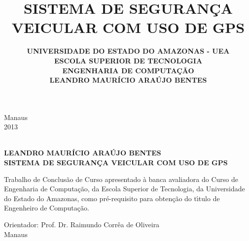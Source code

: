 \documentclass{dcctese}
\begin{document}


\thispagestyle{empty}



\title{ \textbf{SISTEMA DE SEGURAN\c{C}A VEICULAR COM USO DE GPS}}

\author{ \bf UNIVERSIDADE DO ESTADO DO AMAZONAS - UEA \\[12pt] \bf ESCOLA SUPERIOR DE TECNOLOGIA \\[12pt] \bf ENGENHARIA DE COMPUTA\c{C}\~{A}O \\
	[96pt] \bf LEANDRO MAUR\'{I}CIO ARA\'{U}JO BENTES}

\maketitle

\begin{center}
\large Manaus\\
\large 2013
\end{center}

\newpage


\thispagestyle{empty}
\begin{center}
\textbf{\\[4em]LEANDRO MAUR\'{I}CIO ARA\'{U}JO BENTES\\[5cm]}
\textbf{SISTEMA DE SEGURAN\c{C}A VEICULAR COM USO DE GPS\\[96pt]}

\end{center}

\hspace*{8cm}
\begin{minipage}{8cm} 
Trabalho de Conclus\~{a}o de Curso
apresentado \`{a} banca avaliadora do Curso de Engenharia de Computa\c{c}\~{a}o, da 
Escola Superior de Tecnologia, da Universidade do Estado do Amazonas, como
pr\'e-requisito para obten\c{c}\~{a}o do t\'{\i}tulo de Engenheiro de Computa\c{c}\~{a}o.\\[50pt] 
\end{minipage} 

\begin{center}
Orientador: Prof. Dr. Raimundo Corr\^{e}a de Oliveira\\[4ex]
\normal Manaus\\
\end{center}
\end{document}
